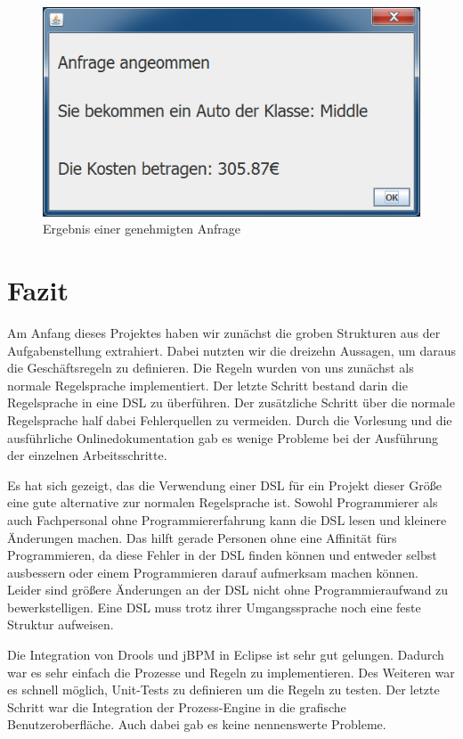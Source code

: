 \begin{figure}
	\centering
	\includegraphics[width=0.7\linewidth]{Bilder/Screenshots/ergebnis}
	\caption{Ergebnis einer genehmigten Anfrage}
	\label{fig:ergebnis}
\end{figure}

\section{Fazit}
Am Anfang dieses Projektes haben wir zunächst die groben Strukturen aus der Aufgabenstellung extrahiert. Dabei nutzten wir die dreizehn Aussagen, um daraus die Geschäftsregeln zu definieren. Die Regeln wurden von uns zunächst als normale Regelsprache implementiert. Der letzte Schritt bestand darin die Regelsprache in eine DSL zu überführen. Der zusätzliche Schritt über die normale Regelsprache half dabei Fehlerquellen zu vermeiden. Durch die Vorlesung und die ausführliche Onlinedokumentation gab es wenige Probleme bei der Ausführung der einzelnen Arbeitsschritte.

Es hat sich gezeigt, das die Verwendung einer DSL für ein Projekt dieser Größe eine gute alternative zur normalen Regelsprache ist. Sowohl Programmierer als auch Fachpersonal ohne Programmiererfahrung kann die DSL lesen und kleinere Änderungen machen. Das hilft gerade Personen ohne eine Affinität fürs Programmieren, da diese Fehler in der DSL finden können und entweder selbst ausbessern oder einem Programmieren darauf aufmerksam machen können. Leider sind größere Änderungen an der DSL nicht ohne Programmieraufwand zu bewerkstelligen. Eine DSL muss trotz ihrer Umgangssprache noch eine feste Struktur aufweisen.

Die Integration von Drools und jBPM in Eclipse ist sehr gut gelungen. Dadurch war es sehr einfach die Prozesse und Regeln zu implementieren. Des Weiteren war es schnell möglich, Unit-Tests zu definieren um die Regeln zu testen. Der letzte Schritt war die Integration der Prozess-Engine in die grafische Benutzeroberfläche. Auch dabei gab es keine nennenswerte Probleme.

